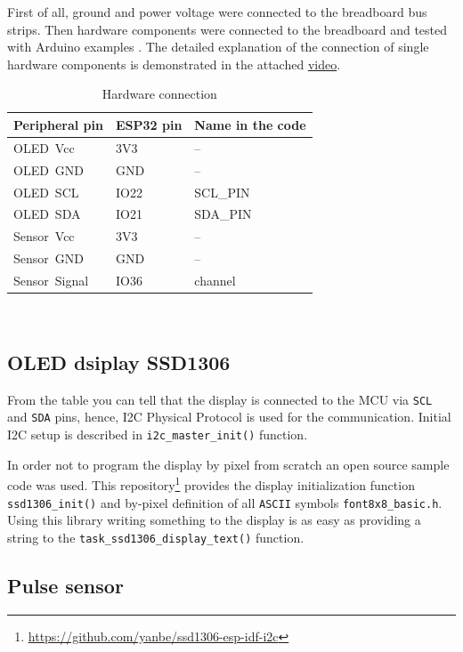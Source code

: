 \documentclass[a4paper, 11pt, twocolumn]{article}
\begin{document}
First of all, ground and power voltage were connected to the breadboard bus strips. Then hardware components were connected to the breadboard and tested with Arduino examples\cite{arduino_heart} \cite{arduino_oled}. The detailed explanation of the connection of single hardware components is demonstrated in the attached \href{https://youtu.be/JHA2dlhXHdE}{video}.
\begin{table}[ht]
		\begin{tabular}{p{2.5cm} p{2.3cm} p{1.9cm}}
			\hline
			Peripheral pin & ESP32 pin & Name in the code\\ \hline
			OLED~Vcc & 3V3 & -- \\
			OLED~GND   & GND & -- \\
			OLED~SCL   & IO22 & SCL\_PIN \\
			OLED~SDA   & IO21 & SDA\_PIN \\
			Sensor~Vcc   & 3V3 & -- \\
			Sensor~GND   & GND & -- \\
			Sensor~Signal   & IO36 & channel \\
		\end{tabular}

		\caption{Hardware connection}
		\label{tab:hardware_connection}
	\end{table}
	\\
\subsection{OLED dsiplay SSD1306}

From the table you can tell that the display is connected to the MCU via \texttt{SCL} and \texttt{SDA} pins, hence, I2C Physical Protocol is used for the communication. Initial I2C setup is described in \texttt{i2c\_master\_init()} function.

In order not to program the display by pixel from scratch an open source sample code was used. This repository\footnote{\url{https://github.com/yanbe/ssd1306-esp-idf-i2c}} provides the display initialization function \texttt{ssd1306\_init()} and by-pixel definition of all \texttt{ASCII} symbols \texttt{font8x8\_basic.h}. Using this library writing something to the display is as easy as providing a string to the \texttt{task\_ssd1306\_display\_text()} function.

\subsection{Pulse sensor}
\end{document}
